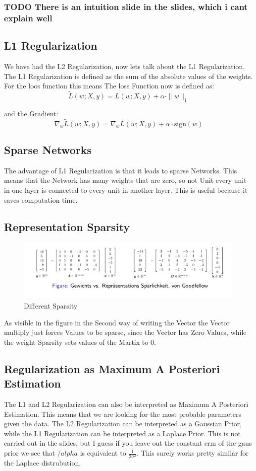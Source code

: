\documentclass[a4paper]{article}
\begin{document}
\subsubsection{TODO There is an intuition slide in the slides, which i cant explain well}
\subsection{L1 Regularization}
We have had the L2 Regularization, now lets talk about the L1 Regularization. The L1 Regularization is defined as the sum of the absolute values of the weights. For the loos function this means
The loss Function now is defined as:
\[
\tilde{L}(w; X, y) = L(w; X, y) + \alpha \cdot \|w\|_1
\]

and the Gradient:
\[
\nabla_w \tilde{L}(w; X, y) = \nabla_w L(w; X, y) + \alpha \cdot \text{sign}(w)
\]

\subsection{Sparse Networks}
The advantage of L1 Regularization is that it leads to sparse Networks. This means that the Network has many weights that are zero, so not Unit every unit in one layer is connected to every unit in another layer. This is useful because it saves computation time. 
\newpage
\subsection{Representation Sparsity}
\begin{figure}[h]
    \centering
    \includegraphics[width=0.99\textwidth]{images/sparsity.png}
    \caption{Different Sparsity}
    \label{fig:Sparsity}
\end{figure}
As visible in the figure in the Second way of writing the Vector the Vector multiply just forces Values to be sparse, since the Vector has Zero Values, while the weight Sparsity sets values of the Martix to $0$. 

\subsection{Regularization as Maximum A Posteriori Estimation}
The L1 and L2 Regularization can also be interpreted as Maximum A Posteriori Estimation. This means that we are looking for the most probable parameters given the data. The L2 Regularization can be interpreted as a Gaussian Prior, while the L1 Regularization can be interpreted as a Laplace Prior. This is not carried out in the slides, but I guess if you leave out the 
constant erm of the gaus prior we see that $/alpha$ is equivalent to $\frac{1}{2 \sigma^{2}}$. This surely works pretty similar for the Laplace distrubution.
\end{document}
